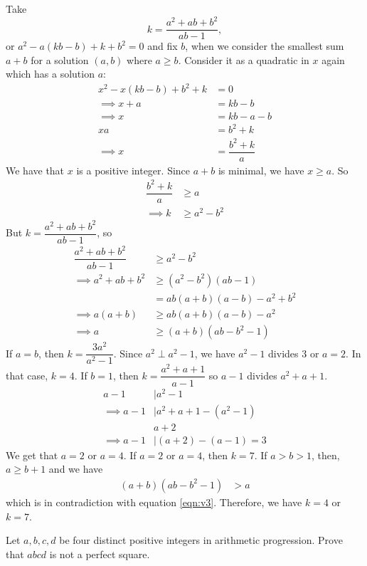 \documentclass{subfile}
\begin{document}
	\begin{solution}
		Take \[k=\dfrac{a^2+ab+b^2}{ab-1},\] or $a^2-a(kb-b)+k+b^2=0$ and fix $b$, when we consider the smallest sum $a+b$ for a solution $(a,b)$ where $a\geq b$. Consider it as a quadratic in $x$ again which has a solution $a$:
			\begin{align*}
				x^2-x(kb-b)+b^2+k
					& = 0\\
				\implies x+a
					& = kb-b\\
				\implies x
					& = kb-a-b\\
				 xa
				 	& =b^2+k\\
				 \implies x
				 	& = \dfrac{b^2+k}{a}
			\end{align*}
		We have that $x$ is a positive integer. Since $a+b$ is minimal, we have $x\geq a$. So
			\begin{align*}
				\dfrac{b^2+k}{a}
					& \geq a\\
				\implies k
					& \geq a^2-b^2
			\end{align*}
		But $k=\dfrac{a^2+ab+b^2}{ab-1}$, so
			\begin{align}
				\dfrac{a^2+ab+b^2}{ab-1}
					& \geq a^2-b^2\nonumber\\
				\implies a^2+ab+b^2
					& \geq (a^2-b^2)(ab-1)\\
					& = ab(a+b)(a-b)-a^2+b^2\nonumber\\
				\implies a(a+b)
					& \geq ab(a+b)(a-b)-a^2\nonumber\\
				\implies a
					& \geq (a+b)(ab-b^2-1)\label{eqn:v3}
			\end{align}
		If $a=b$, then $k=\dfrac{3a^2}{a^2-1}$. Since $a^2\perp a^2-1$, we have $a^2-1$ divides $3$ or $a=2$. In that case, $k=4$. If $b=1$, then $k=\dfrac{a^2+a+1}{a-1}$ so $a-1$ divides $a^2+a+1$.
			\begin{align*}
				a-1
					& \mid a^2-1\\
				\implies a-1
					& \mid a^2+a+1-(a^2-1)\\
					& a+2\\
				\implies a-1
					& \mid (a+2)-(a-1)=3
			\end{align*}
		We get that $a=2$ or $a=4$. If $a=2$ or $a=4$, then $k=7$. If $a>b>1$, then, $a\geq b+1$ and we have
			\begin{align*}
				(a+b)(ab-b^2-1) & > a
			\end{align*}
		which is in contradiction with equation \eqref{eqn:v3}. Therefore, we have $k=4$ or $k=7$.
	\end{solution}

	\begin{problem}
		Let $ a,b,c,d$ be four distinct positive integers in arithmetic progression. Prove that $ abcd$ is not a perfect square.
	\end{problem}
\end{document}
